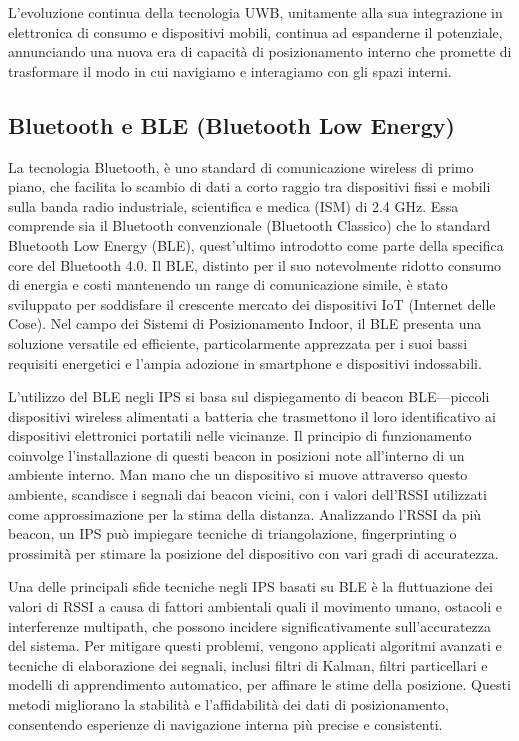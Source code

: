 L'evoluzione continua della tecnologia UWB, unitamente alla sua integrazione in elettronica di consumo e dispositivi mobili, continua ad espanderne il potenziale, annunciando una nuova era di capacità di posizionamento interno che promette di trasformare il modo in cui navigiamo e interagiamo con gli spazi interni.

\subsection{Bluetooth e BLE (Bluetooth Low Energy)}

\hspace{\parindent}La tecnologia Bluetooth, è uno standard di comunicazione wireless di primo piano, che facilita lo scambio di dati a corto raggio tra dispositivi fissi e mobili sulla banda radio industriale, scientifica e medica (ISM) di 2.4 GHz. Essa comprende sia il Bluetooth convenzionale (Bluetooth Classico) che lo standard Bluetooth Low Energy (BLE), quest'ultimo introdotto come parte della specifica core del Bluetooth 4.0. Il BLE, distinto per il suo notevolmente ridotto consumo di energia e costi mantenendo un range di comunicazione simile, è stato sviluppato per soddisfare il crescente mercato dei dispositivi IoT (Internet delle Cose). Nel campo dei Sistemi di Posizionamento Indoor, il BLE presenta una soluzione versatile ed efficiente, particolarmente apprezzata per i suoi bassi requisiti energetici e l'ampia adozione in smartphone e dispositivi indossabili.

L'utilizzo del BLE negli IPS si basa sul dispiegamento di beacon BLE—piccoli dispositivi wireless alimentati a batteria che trasmettono il loro identificativo ai dispositivi elettronici portatili nelle vicinanze. Il principio di funzionamento coinvolge l'installazione di questi beacon in posizioni note all'interno di un ambiente interno. Man mano che un dispositivo si muove attraverso questo ambiente, scandisce i segnali dai beacon vicini, con i valori dell'RSSI utilizzati come approssimazione per la stima della distanza. Analizzando l'RSSI da più beacon, un IPS può impiegare tecniche di triangolazione, fingerprinting o prossimità per stimare la posizione del dispositivo con vari gradi di accuratezza.~\cite{qureshi2018analysis}

Una delle principali sfide tecniche negli IPS basati su BLE è la fluttuazione dei valori di RSSI a causa di fattori ambientali quali il movimento umano, ostacoli e interferenze multipath, che possono incidere significativamente sull'accuratezza del sistema. Per mitigare questi problemi, vengono applicati algoritmi avanzati e tecniche di elaborazione dei segnali, inclusi filtri di Kalman, filtri particellari e modelli di apprendimento automatico, per affinare le stime della posizione. Questi metodi migliorano la stabilità e l'affidabilità dei dati di posizionamento, consentendo esperienze di navigazione interna più precise e consistenti.

